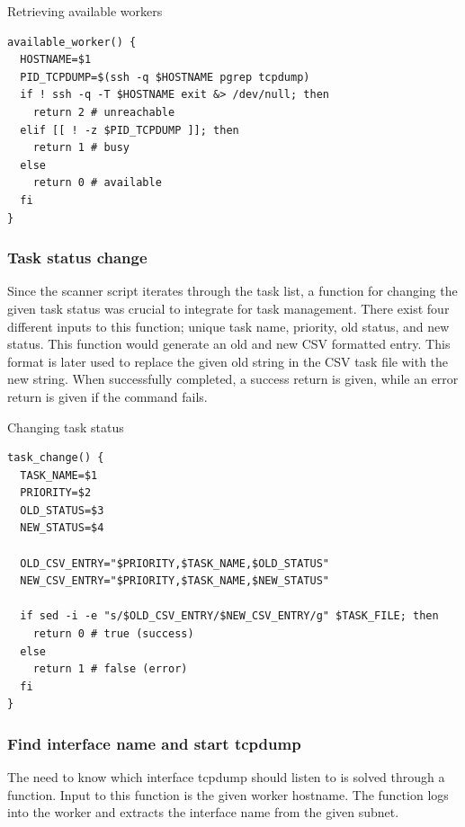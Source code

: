 \begin{listing}[!ht]
\caption{Retrieving available workers}
\label{lst:AvailableWorker}
\begin{verbatim}
available_worker() {
  HOSTNAME=$1
  PID_TCPDUMP=$(ssh -q $HOSTNAME pgrep tcpdump)
  if ! ssh -q -T $HOSTNAME exit &> /dev/null; then
    return 2 # unreachable
  elif [[ ! -z $PID_TCPDUMP ]]; then
    return 1 # busy
  else
    return 0 # available
  fi
}
\end{verbatim}
\end{listing}


\subsubsection{Task status change}
\label{ss:TaskStatusChange}
Since the scanner script iterates through the task list, a function for changing the given task status was crucial to integrate for task management.
There exist four different inputs to this function; unique task name, priority, old status, and new status.
This function would generate an old and new CSV formatted entry.
This format is later used to replace the given old string in the CSV task file with the new string.
When successfully completed, a success return is given, while an error return is given if the command fails.

\begin{listing}[!ht]
\caption{Changing task status}
\label{lst:TaskChange}
\begin{verbatim}
task_change() {
  TASK_NAME=$1
  PRIORITY=$2
  OLD_STATUS=$3
  NEW_STATUS=$4

  OLD_CSV_ENTRY="$PRIORITY,$TASK_NAME,$OLD_STATUS"
  NEW_CSV_ENTRY="$PRIORITY,$TASK_NAME,$NEW_STATUS"

  if sed -i -e "s/$OLD_CSV_ENTRY/$NEW_CSV_ENTRY/g" $TASK_FILE; then
    return 0 # true (success)
  else
    return 1 # false (error)
  fi
}
\end{verbatim}
\end{listing}

\subsubsection{Find interface name and start tcpdump}
The need to know which interface tcpdump should listen to is solved through a function.
Input to this function is the given worker hostname.
The function logs into the worker and extracts the interface name from the given subnet.

